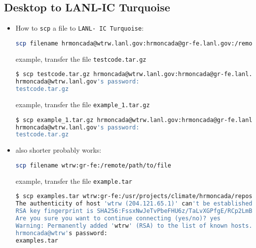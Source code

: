 \subsection{Desktop to LANL-IC Turquoise}
\begin{itemize}
 \item How to \verb+scp+ a file to \verb+LANL- IC Turquoise+:
\begin{lstlisting}[language=bash,numbers=none] 
scp filename hrmoncada@wtrw.lanl.gov:hrmoncada@gr-fe.lanl.gov:/remote/path/to/file
\end{lstlisting}
example, transfer the  file \verb+testcode.tar.gz+
\begin{lstlisting}[language=bash,numbers=none,basicstyle=\scriptsize] 
$ scp testcode.tar.gz hrmoncada@wtrw.lanl.gov:hrmoncada@gr-fe.lanl.gov:/usr/projects/climate/hrmoncada/repos/debug_examples
hrmoncada@wtrw.lanl.gov's password: 
testcode.tar.gz                                                               100% 1124     1.1KB/s   00:00
\end{lstlisting}
example, transfer the  file \verb+example_1.tar.gz+
\begin{lstlisting}[language=bash,numbers=none,basicstyle=\scriptsize] 
$ scp example_1.tar.gz hrmoncada@wtrw.lanl.gov:hrmoncada@gr-fe.lanl.gov:/usr/projects/climate/hrmoncada/repos/debug_examples
hrmoncada@wtrw.lanl.gov's password: 
testcode.tar.gz                                                               100% 1124     1.1KB/s   00:00
\end{lstlisting}
\item also shorter probably works:
\begin{lstlisting}[language=bash,numbers=none] 
scp filename wtrw:gr-fe:/remote/path/to/file
\end{lstlisting}
example, transfer the  file \verb+example.tar+
\begin{lstlisting}[language=bash,numbers=none,basicstyle=\scriptsize] 
$ scp examples.tar wtrw:gr-fe:/usr/projects/climate/hrmoncada/repos/debug_examples
The authenticity of host 'wtrw (204.121.65.1)' can't be established.
RSA key fingerprint is SHA256:FssxNwJeTvPbeFHU6z/TaLvXGPfgE/RCp2LmBQzdlBs.
Are you sure you want to continue connecting (yes/no)? yes
Warning: Permanently added 'wtrw' (RSA) to the list of known hosts.
hrmoncada@wtrw's password: 
examples.tar                                                                 100%   20KB  20.0KB/s   00:00  
\end{lstlisting}

\end{itemize}
